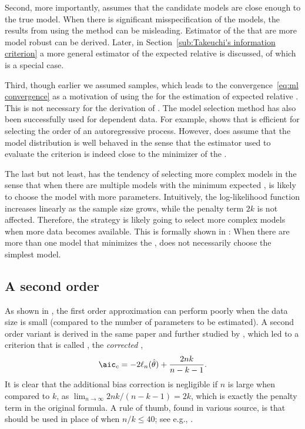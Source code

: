 Second, more importantly, \aic assumes that the candidate models are close
enough to the true model. When there is significant misspecification of the
models, the results from using the \aic method can be misleading. Estimator
of the \kld that are more model robust can be derived. Later, in
Section~\ref{sub:Takeuchi's information criterion} a more general estimator
of the expected relative \kld is discussed, of which \aic is a special case.

Third, though earlier we assumed \iid samples, which leads to the
convergence~\eqref{eq:ml convergence} as a motivation of using the \mle for
the estimation of expected relative \kld. This is not necessary for the
derivation of \aic. The \aic model selection method has also been
successfully used for dependent data. For example, \cite{Lee:2001tm} shows
that \aic is efficient for selecting the order of an autoregressive process.
However, \aic does assume that the model distribution is well behaved in the
sense that the estimator used to evaluate the criterion is indeed close to
the minimizer of the \kld.

The last but not least, \aic has the tendency of selecting more complex
models in the sense that when there are multiple models with the minimum
expected \kld, \aic is likely to choose the model with more parameters.
Intuitively, the log-likelihood function increases linearly as the sample
size grows, while the penalty term $2k$ is not affected. Therefore, the \aic
strategy is likely going to select more complex models when more data becomes
available. This is formally shown in \cite{Sin:1996vs}: When there are more
than one model that minimizes the \kld, \aic does not necessarily choose the
simplest model.

\subsection{A second order \protect\aic}
\label{sub:A second order aic}

As shown in \cite{Sugiura:1978be}, the first order approximation can perform
poorly when the data size is small (compared to the number of parameters to
be estimated). A second order variant is derived in the same paper and
further studied by \cite{Hurvich:1989ev}, which led to a criterion that is
called \aicc, the \emph{corrected} \aic,
\begin{equation}
  \aicc = -2\ell_n(\hat\theta) + \frac{2nk}{n-k-1}.
\end{equation}
It is clear that the additional bias correction is negligible if $n$ is large
when compared to $k$, as $\lim_{n\to\infty}2nk/(n-k-1) = 2k$, which is
exactly the penalty term in the original \aic formula. A rule of thumb, found
in various source, is that \aicc should be used in place of \aic when
$n/k\le40$; see e.g., \cite[][sec.~2.4]{Burnham:2002wc}.

